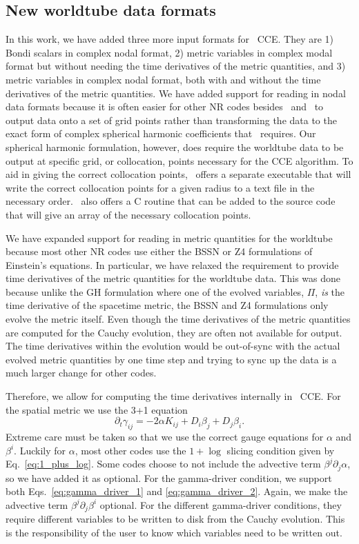 \begin{bibunit}[unsrtnat]
\subsection{New worldtube data formats}

In this work, we have added three more input formats for \spectre~CCE. They are
1) Bondi scalars in complex nodal format, 2) metric variables in complex modal
format but without needing the time derivatives of the metric quantities, and 3)
metric variables in complex nodal format, both with and without the time
derivatives of the metric quantities. We have added support for reading in nodal
data formats because it is often easier for other NR codes besides \spec~and
\spectre~to output data onto a set of grid points rather than transforming the
data to the exact form of complex spherical harmonic coefficients that
\spectre~requires. Our spherical harmonic formulation, however, does require the
worldtube data to be output at specific grid, or collocation, points necessary
for the CCE algorithm. To aid in giving the correct collocation points,
\spectre~offers a separate executable that will write the correct collocation
points for a given radius to a text file in the necessary order. \spectre~also
offers a C routine that can be added to the source code that will give an array
of the necessary collocation points.

We have expanded support for reading in metric quantities for the worldtube
because most other NR codes use either the BSSN or Z4 formulations of Einstein's
equations. In particular, we have relaxed the requirement to provide time
derivatives of the metric quantities for the worldtube data. This was done
because unlike the GH formulation where one of the evolved variables, $\Pi$,
\textit{is} the time derivative of the spacetime metric, the BSSN and Z4
formulations only evolve the metric itself. Even though the time derivatives of
the metric quantities are computed for the Cauchy evolution, they are often not
available for output. The time derivatives within the evolution would be
out-of-sync with the actual evolved metric quantities by one time step and
trying to sync up the data is a much larger change for other codes.

Therefore, we allow for computing the time derivatives internally in
\spectre~CCE. For the spatial metric we use the 3+1 equation
\begin{equation}
  \partial_t\gamma_{ij} = -2\alpha K_{ij} + D_i\beta_j + D_j\beta_i .
\end{equation}
Extreme care must be taken so that we use the
correct gauge equations for $\alpha$ and $\beta^i$. Luckily for $\alpha$, most
other codes use the $1+\log$ slicing condition given by Eq.~\ref{eq:1_plus_log}.
Some codes choose to not include the advective term $\beta^j\partial_j\alpha$,
so we have added it as optional. For the gamma-driver condition, we support both
Eqs.~\ref{eq:gamma_driver_1} and \ref{eq:gamma_driver_2}. Again, we make the
advective term $\beta^j\partial_j\beta^i$ optional. For the different
gamma-driver conditions, they require different variables to be written to disk
from the Cauchy evolution. This is the responsibility of the user to know which
variables need to be written out.


\end{bibunit}
